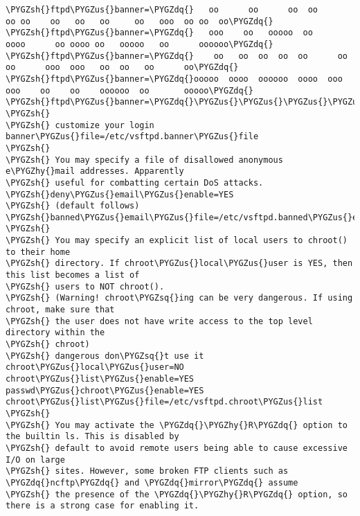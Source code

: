 \documentclass[letterpaper,10pt,english]{sphinxmanual}
\def\PYGZus{\char`\_}
\def\PYGZsh{\char`\#}
\def\PYGZhy{\char`\-}
\def\PYGZsq{\char`\'}
\def\PYGZdq{\char`\"}
\begin{document}
\begin{Verbatim}[commandchars=\\\{\}]
\PYGZsh{}ftpd\PYGZus{}banner=\PYGZdq{}   oo      oo      oo  oo      oo oo    oo   oo   oo     oo   ooo  oo oo  oo\PYGZdq{}
\PYGZsh{}ftpd\PYGZus{}banner=\PYGZdq{}   ooo    oo   ooooo  oo      oooo      oo oooo oo   ooooo   oo      oooooo\PYGZdq{}
\PYGZsh{}ftpd\PYGZus{}banner=\PYGZdq{}    oo   oo  oo  oo  oo      oo oo      ooo  ooo   oo  oo   oo      oo\PYGZdq{}
\PYGZsh{}ftpd\PYGZus{}banner=\PYGZdq{}ooooo  oooo  oooooo  oooo  ooo  ooo    oo    oo    oooooo  oo       ooooo\PYGZdq{}
\PYGZsh{}ftpd\PYGZus{}banner=\PYGZdq{}\PYGZus{}\PYGZus{}\PYGZus{}\PYGZus{}\PYGZus{}\PYGZus{}\PYGZus{}\PYGZus{}\PYGZus{}\PYGZus{}\PYGZus{}\PYGZus{}\PYGZus{}\PYGZus{}\PYGZus{}\PYGZus{}\PYGZus{}\PYGZus{}\PYGZus{}\PYGZus{}\PYGZus{}\PYGZus{}\PYGZus{}\PYGZus{}\PYGZus{}\PYGZus{}\PYGZus{}\PYGZus{}\PYGZus{}\PYGZus{}\PYGZus{}\PYGZus{}\PYGZus{}\PYGZus{}\PYGZus{}\PYGZus{}\PYGZus{}\PYGZus{}\PYGZus{}\PYGZus{}\PYGZus{}\PYGZus{}\PYGZus{}\PYGZus{}\PYGZus{}\PYGZus{}\PYGZus{}\PYGZus{}\PYGZus{}\PYGZus{}\PYGZus{}\PYGZus{}\PYGZus{}\PYGZus{}\PYGZus{}\PYGZus{}\PYGZus{}\PYGZus{}\PYGZus{}\PYGZus{}\PYGZus{}Jeffrey\PYGZus{}\PYGZus{}\PYGZus{}\PYGZus{}\PYGZus{}\PYGZdq{}
\PYGZsh{}
\PYGZsh{} customize your login
banner\PYGZus{}file=/etc/vsftpd.banner\PYGZus{}file
\PYGZsh{}
\PYGZsh{} You may specify a file of disallowed anonymous e\PYGZhy{}mail addresses. Apparently
\PYGZsh{} useful for combatting certain DoS attacks.
\PYGZsh{}deny\PYGZus{}email\PYGZus{}enable=YES
\PYGZsh{} (default follows)
\PYGZsh{}banned\PYGZus{}email\PYGZus{}file=/etc/vsftpd.banned\PYGZus{}emails
\PYGZsh{}
\PYGZsh{} You may specify an explicit list of local users to chroot() to their home
\PYGZsh{} directory. If chroot\PYGZus{}local\PYGZus{}user is YES, then this list becomes a list of
\PYGZsh{} users to NOT chroot().
\PYGZsh{} (Warning! chroot\PYGZsq{}ing can be very dangerous. If using chroot, make sure that
\PYGZsh{} the user does not have write access to the top level directory within the
\PYGZsh{} chroot)
\PYGZsh{} dangerous don\PYGZsq{}t use it
chroot\PYGZus{}local\PYGZus{}user=NO
chroot\PYGZus{}list\PYGZus{}enable=YES
passwd\PYGZus{}chroot\PYGZus{}enable=YES
chroot\PYGZus{}list\PYGZus{}file=/etc/vsftpd.chroot\PYGZus{}list
\PYGZsh{}
\PYGZsh{} You may activate the \PYGZdq{}\PYGZhy{}R\PYGZdq{} option to the builtin ls. This is disabled by
\PYGZsh{} default to avoid remote users being able to cause excessive I/O on large
\PYGZsh{} sites. However, some broken FTP clients such as \PYGZdq{}ncftp\PYGZdq{} and \PYGZdq{}mirror\PYGZdq{} assume
\PYGZsh{} the presence of the \PYGZdq{}\PYGZhy{}R\PYGZdq{} option, so there is a strong case for enabling it.

\end{Verbatim}
\end{document}
